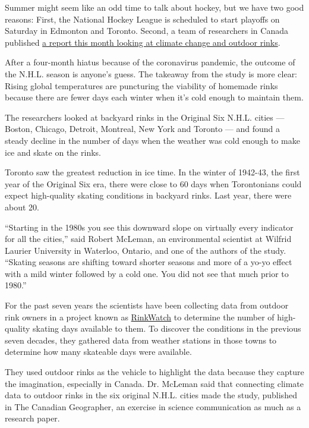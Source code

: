Summer might seem like an odd time to talk about hockey, but we have two
good reasons: First, the National Hockey League is scheduled to start
playoffs on Saturday in Edmonton and Toronto. Second, a team of
researchers in Canada published
\href{https://onlinelibrary.wiley.com/doi/10.1111/cag.12640}{a report
this month looking at climate change and outdoor rinks}.

After a four-month hiatus because of the coronavirus pandemic, the
outcome of the N.H.L. season is anyone's guess. The takeaway from the
study is more clear: Rising global temperatures are puncturing the
viability of homemade rinks because there are fewer days each winter
when it's cold enough to maintain them.

The researchers looked at backyard rinks in the Original Six N.H.L.
cities --- Boston, Chicago, Detroit, Montreal, New York and Toronto ---
and found a steady decline in the number of days when the weather was
cold enough to make ice and skate on the rinks.

Toronto saw the greatest reduction in ice time. In the winter of
1942-43, the first year of the Original Six era, there were close to 60
days when Torontonians could expect high-quality skating conditions in
backyard rinks. Last year, there were about 20.

``Starting in the 1980s you see this downward slope on virtually every
indicator for all the cities,'' said Robert McLeman, an environmental
scientist at Wilfrid Laurier University in Waterloo, Ontario, and one of
the authors of the study. ``Skating seasons are shifting toward shorter
seasons and more of a yo-yo effect with a mild winter followed by a cold
one. You did not see that much prior to 1980.''

For the past seven years the scientists have been collecting data from
outdoor rink owners in a project known as
\href{https://twitter.com/rinkwatchorg?lang=en}{RinkWatch} to determine
the number of high-quality skating days available to them. To discover
the conditions in the previous seven decades, they gathered data from
weather stations in those towns to determine how many skateable days
were available.

They used outdoor rinks as the vehicle to highlight the data because
they capture the imagination, especially in Canada. Dr. McLeman said
that connecting climate data to outdoor rinks in the six original N.H.L.
cities made the study, published in The Canadian Geographer, an exercise
in science communication as much as a research paper.

